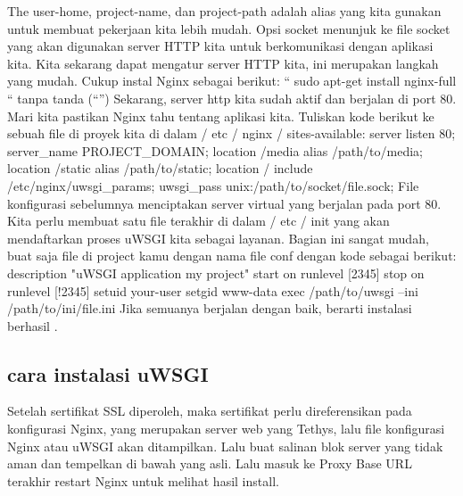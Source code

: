 The user-home, project-name, dan project-path adalah alias yang kita gunakan untuk membuat pekerjaan kita lebih mudah. Opsi socket menunjuk ke file socket yang akan digunakan server HTTP kita untuk berkomunikasi dengan aplikasi kita.
Kita sekarang dapat mengatur server HTTP kita, ini merupakan langkah yang mudah. Cukup instal Nginx sebagai berikut:
“ sudo apt-get install nginx-full “ tanpa tanda (“”)
Sekarang, server http kita sudah aktif dan berjalan di port 80. Mari kita pastikan Nginx tahu tentang aplikasi kita. Tuliskan kode berikut ke sebuah file di proyek kita di dalam / etc / nginx / sites-available:
server {
listen 80;
server_name PROJECT_DOMAIN;
location /media {
alias /path/to/media;
}
location /static {
alias /path/to/static;
}
location / {
include /etc/nginx/uwsgi_params;
uwsgi_pass unix:/path/to/socket/file.sock;
}
}
File konfigurasi sebelumnya menciptakan server virtual yang berjalan pada port 80. Kita perlu membuat satu file terakhir di dalam / etc / init yang akan mendaftarkan proses uWSGI kita sebagai layanan. Bagian ini sangat mudah, buat saja file di project kamu dengan nama file conf dengan kode sebagai berikut:
description "uWSGI application my project"
start on runlevel [2345]
stop on runlevel [!2345]
setuid your-user
setgid www-data
exec /path/to/uwsgi --ini /path/to/ini/file.ini
Jika semuanya berjalan dengan baik, berarti instalasi berhasil \cite{maia2015building}.


\subsection {cara instalasi uWSGI}
Setelah sertifikat SSL diperoleh, maka sertifikat perlu direferensikan pada konfigurasi Nginx, yang merupakan server web yang Tethys, lalu file konfigurasi Nginx atau uWSGI akan ditampilkan. Lalu buat salinan blok server yang tidak aman dan tempelkan di bawah yang asli. Lalu masuk ke Proxy Base URL terakhir restart Nginx untuk melihat hasil install\cite{swain2018tethys}.

